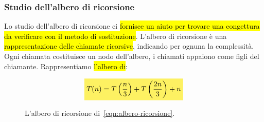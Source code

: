 \documentclass[a4paper,11pt,oneside]{article}
\theoremstyle{plain}
\theoremstyle{definition}
\theoremstyle{remark}
\newcommand{\mhl}[1]{\colorbox{hlcolor}{$\displaystyle #1$}}
\begin{document}
\subsubsection{Studio dell'albero di ricorsione}\label{sec:alg-ricorsivi-albero}

Lo studio dell'albero di ricorsione ci \hl{fornisce un aiuto per trovare una
congettura da verificare con il metodo di sostituzione}. L'albero di ricorsione è
una \hl{rappresentazione delle chiamate ricorsive}, indicando per ognuna la
complessità. Ogni chiamata costituisce un nodo dell'albero, i chiamati appaiono
come figli del chiamante. Rappresentiamo \hl{l'albero di}:

\begin{equation}
  \mhl{
    T(n) = T\left(\frac{n}{3}\right) + T\left(\frac{2n}{3}\right) + n\label{eqn:albero-ricorsione}
  }
\end{equation}

\begin{figure}[htb]
  \centering
  \caption{L'albero di ricorsione di~\ref{eqn:albero-ricorsione}.}%
  \label{fig:albero-ricorsione}
\end{figure}
\end{document}

